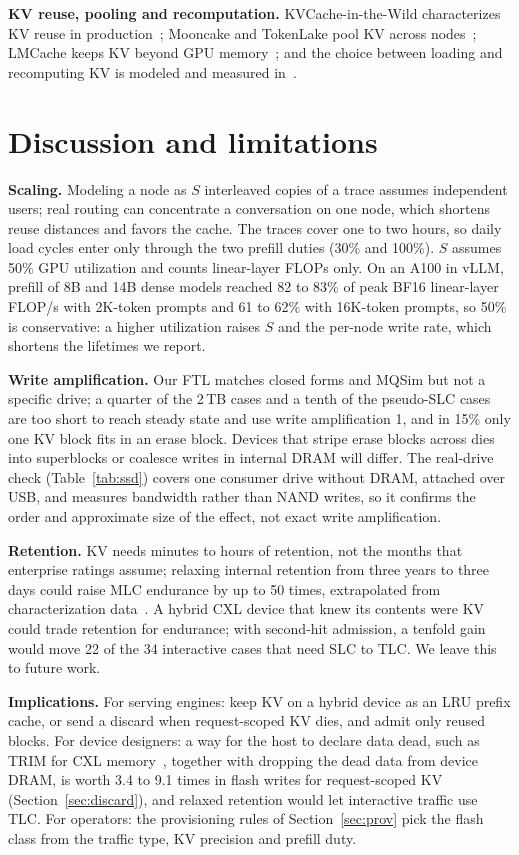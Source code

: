 \documentclass[acmsmall,screen,review]{acmart}
\begin{document}
\textbf{KV reuse, pooling and recomputation.} KVCache-in-the-Wild characterizes KV reuse in
production~\cite{kvwild}; Mooncake and TokenLake pool KV across nodes~\cite{mooncake,tokenlake};
LMCache keeps KV beyond GPU memory~\cite{lmcache}; and the choice between loading and recomputing KV
is modeled and measured in~\cite{restore_recompute,pykvcache}.

\section{Discussion and limitations}
\label{sec:disc}
\textbf{Scaling.} Modeling a node as $S$ interleaved copies of a trace assumes independent users;
real routing can concentrate a conversation on one node, which shortens reuse distances and favors
the cache. The traces cover one to two hours, so daily load cycles enter only through the two prefill
duties (30\% and 100\%). $S$ assumes 50\% GPU utilization and counts linear-layer FLOPs only. On an
A100 in vLLM, prefill of 8B and 14B dense models reached 82 to 83\% of peak BF16 linear-layer FLOP/s
with 2K-token prompts and 61 to 62\% with 16K-token prompts, so 50\% is conservative: a higher
utilization raises $S$ and the per-node write rate, which shortens the lifetimes we report.

\textbf{Write amplification.} Our FTL matches closed forms and MQSim but not a specific drive; a
quarter of the 2\,TB cases and a tenth of the pseudo-SLC cases are too short to reach steady state
and use write amplification 1, and in 15\% only one KV block fits in an erase block. Devices that
stripe erase blocks across dies into superblocks or coalesce writes in internal DRAM will differ. The
real-drive check (Table~\ref{tab:ssd}) covers one consumer drive without DRAM, attached over USB, and
measures bandwidth rather than NAND writes, so it confirms the order and approximate size of the
effect, not exact write amplification.

\textbf{Retention.} KV needs minutes to hours of retention, not the months that enterprise ratings
assume; relaxing internal retention from three years to three days could raise MLC endurance by up
to 50 times, extrapolated from characterization data~\cite{warm}. A hybrid CXL device that knew its
contents were KV could trade retention for endurance; with second-hit admission, a tenfold gain
would move 22 of the 34 interactive cases that need SLC to TLC. We leave this to future work.

\textbf{Implications.} For serving engines: keep KV on a hybrid device as an LRU prefix cache, or
send a discard when request-scoped KV dies, and admit only reused blocks. For device
designers: a way for the host to declare data dead, such as TRIM for CXL memory~\cite{trimcxl},
together with dropping the dead data from device DRAM, is worth 3.4 to 9.1 times in flash writes for
request-scoped KV (Section~\ref{sec:discard}), and relaxed retention would let interactive traffic use
TLC. For operators: the provisioning
rules of Section~\ref{sec:prov} pick the flash class from the traffic type, KV precision and
prefill duty.
\end{document}
